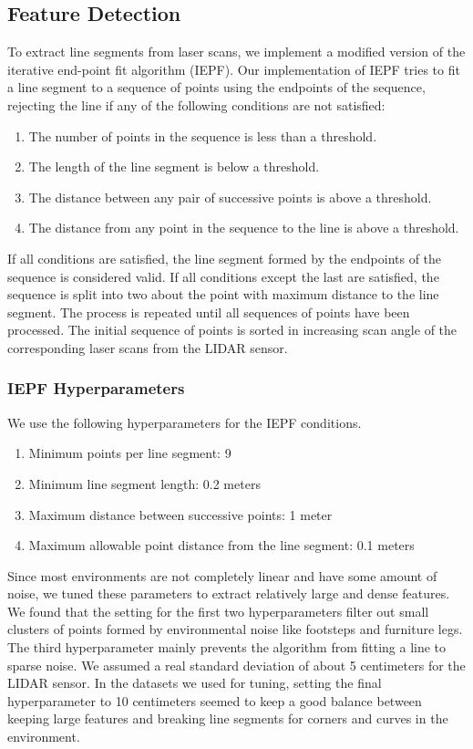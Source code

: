 \documentclass[11pt]{article}
\begin{document}
\subsection{Feature Detection}

To extract line segments from laser scans, we implement a modified version of the iterative end-point fit algorithm (IEPF).
Our implementation of IEPF tries to fit a line segment to a sequence of points using the endpoints of the sequence, rejecting the line if any of the following conditions are not satisfied:

\begin{enumerate}
    \item The number of points in the sequence is less than a threshold.
    \item The length of the line segment is below a threshold.
    \item The distance between any pair of successive points is above a threshold.
    \item The distance from any point in the sequence to the line is above a threshold.
\end{enumerate}

\noindent
If all conditions are satisfied, the line segment formed by the endpoints of the sequence is considered valid.
If all conditions except the last are satisfied, the sequence is split into two about the point with maximum distance to the line segment. The process is repeated until all sequences of points have been processed.
The initial sequence of points is sorted in increasing scan angle of the corresponding laser scans from the LIDAR sensor.

\subsubsection{IEPF Hyperparameters}

We use the following hyperparameters for the IEPF conditions.

\begin{enumerate}
    \item Minimum points per line segment: 9
    \item Minimum line segment length: 0.2 meters
    \item Maximum distance between successive points: 1 meter
    \item Maximum allowable point distance from the line segment: 0.1 meters
\end{enumerate}

\noindent
Since most environments are not completely linear and have some amount of noise, we tuned these parameters to extract relatively large and dense features. We found that the setting for the first two hyperparameters filter out small clusters of points formed by environmental noise like footsteps and furniture legs. The third hyperparameter mainly prevents the algorithm from fitting a line to sparse noise. We assumed a real standard deviation of about 5 centimeters for the LIDAR sensor. In the datasets we used for tuning, setting the final hyperparameter to 10 centimeters seemed to keep a good balance between keeping large features and breaking line segments for corners and curves in the environment.
\end{document}
